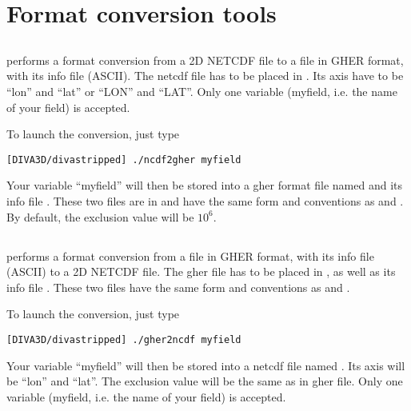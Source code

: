\section{Format conversion tools}

\subsection{}

 performs a format conversion from a 2D NETCDF file to a file in GHER format, with its info file (ASCII).
The netcdf file  has to be placed in . Its axis have to be ``lon'' and ``lat'' or ``LON'' and ``LAT''.
Only one variable (myfield, i.e. the name of your field) is accepted. 

To launch the conversion, just type 

\begin{lstlisting}[style=Bash]
[DIVA3D/divastripped] ./ncdf2gher myfield
\end{lstlisting}

Your variable ``myfield'' will then be stored into a gher format file named  and its info file .
These two files are in  and have the same form and conventions as  and .
By default, the exclusion value will be $10^6$.


\subsection{}

 performs a format conversion from a file in GHER format, with its info file (ASCII) to a 2D NETCDF file.
The gher file  has to be placed in , as well as its info file . 
These two files have the same form and conventions as  and . 

To launch the conversion, just type 

\begin{lstlisting}[style=Bash]
[DIVA3D/divastripped] ./gher2ncdf myfield
\end{lstlisting}

Your variable ``myfield'' will then be stored into a netcdf file named . Its axis will be ``lon'' and ``lat''.
The exclusion value will be the same as in gher file. Only one variable (myfield, i.e. the name of your field) is accepted. 

